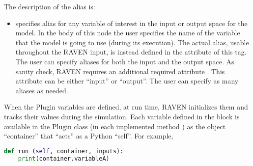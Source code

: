 The description of the alias is:
\begin{itemize}
\item {}  specifies alias for
any variable of interest in the input or output space for the model.
%
In the body of this node the user specifies the name of the variable that the model is going to use
(during its execution).
%
The actual alias, usable throughout the RAVEN input, is instead defined in the
 attribute of this tag.
\\The user can specify aliases for both the input and the output space. As sanity check, RAVEN
requires an additional required attribute . This attribute can be either ``input'' or ``output''.
%
\nb The user can specify as many aliases as needed.
\end{itemize}

When the Plugin variables are defined, at run time, RAVEN initializes
them and tracks their values during the simulation.
%
Each variable defined in the  block is available in the
Plugin class (in each implemented method ) as the object ``container'' that ``acts''
as a Python ``self''. For example,
\begin{lstlisting}[language=python]
  def run (self, container, inputs):
    print(container.variableA)
\end{lstlisting}

